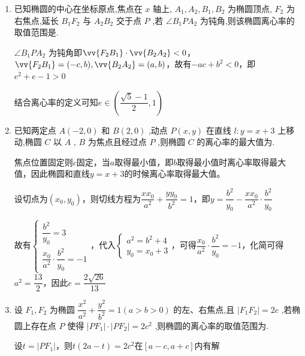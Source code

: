 \begin{enumerate}
    \item 已知椭圆的中心在坐标原点,焦点在 $x$ 轴上, ${A}_{1},{A}_{2},{B}_{1},{B}_{2}$ 为椭圆顶点, ${F}_{2}$ 为右焦点,延长 ${B}_{1}{F}_{2}$ 与 ${A}_{2}{B}_{2}$ 交于点 $P$ ,若 $\angle {B}_{1}P{A}_{2}$ 为钝角,则该椭圆离心率的取值范围是.
    \begin{jieda}
        $\angle {B}_{1}P{A}_{2}$ 为钝角即$\vv{F_2B_1} \cdot \vv{B_2A_2} < 0$，$\vv{F_2B_1} = (-c, b), \vv{B_2A_2} = (a, b)$，故有$-ac+b^2<0$，即$e^2+e-1>0$

        结合离心率的定义可知$e \in \left(\dfrac{\sqrt{5}-1}{2}, 1\right)$
    \end{jieda}
    \item 已知两定点 $A\left( {-2,0}\right)$ 和 $B\left( {2,0}\right)$ ,动点 $P\left( {x,y}\right)$ 在直线 $l : y = x + 3$ 上移动,椭圆 $C$ 以 $A$ , $B$ 为焦点且经过点 $P$ ,则椭圆 $C$ 的离心率的最大值为.
    \begin{jieda}
        焦点位置固定则$c$固定，当$a$取得最小值，即$b$取得最小值时离心率取得最大值，因此椭圆和直线$y = x + 3$的时候离心率取得最大值。

        设切点为$(x_0, y_0)$，则切线方程为$\dfrac{xx_0}{a^2}+\dfrac{yy_0}{b^2} = 1$，即$y = \dfrac{b^2}{y_0} - \dfrac{xx_0}{a^2} \cdot \dfrac{b^2}{y_0}$

        故有$\left\{\begin{array}{l}
             \dfrac{b^2}{y_0} = 3  \\
             \dfrac{x_0}{a^2} \cdot \dfrac{b^2}{y_0} = -1
        \end{array}\right.$，代入$\left\{\begin{array}{l}
             a^2 = b^2 + 4  \\
             y_0 = x_0 + 3
        \end{array}\right.$，可得$\dfrac{x_0}{a^2} \cdot \dfrac{b^2}{y_0} = -1$，化简可得$a^2 = \dfrac{13}{2}$，因此$e = \dfrac{2\sqrt{26}}{13}$
    \end{jieda}
    \item 设 ${F}_{1},{F}_{2}$ 为椭圆 $\dfrac{{x}^{2}}{{a}^{2}} + \dfrac{{y}^{2}}{{b}^{2}} = 1\left( {a > b > 0}\right)$ 的左、右焦点,且 $\left| {{F}_{1}{F}_{2}}\right|  = {2c}$ ,若椭圆上存在点 $P$ 使得 $\left| {P{F}_{1}}\right|  \cdot  \left| {P{F}_{2}}\right|  = 2{c}^{2}$ ,则椭圆的离心率的取值范围为.
    \begin{jieda}
        设$t = |PF_1|$，则$t(2a-t) = 2c^2$在$[a-c, a+c]$内有解


\end{jieda}
\end{enumerate}
